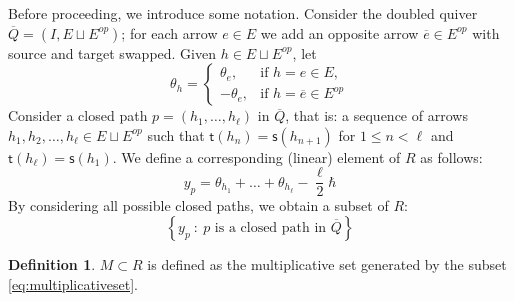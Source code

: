 \documentclass[11pt,reqno]{amsart}
\numberwithin{equation}{section}
\theoremstyle{definition}
\newtheorem{Definition}[equation]{Definition}
\newcommand{\source}{\mathsf{s}}
\newcommand{\target}{\mathsf{t}}
\newcommand{\quiver}{Q}
\newcommand{\arrowset}{E}
\newcommand{\base}{R}
\begin{document}
Before proceeding, we introduce some notation. Consider the doubled quiver $\overline{\quiver} = (I, \arrowset\sqcup \arrowset^{op})$;  for each arrow $e \in \arrowset$ we add an opposite arrow $\overline{e} \in \arrowset^{op}$ with source and target swapped.  Given $h \in \arrowset\sqcup \arrowset^{op}$, let 
\begin{equation}
\theta_h =  \left\{ \begin{array}{cl} \theta_e, & \text{if } h = e \in \arrowset, \\ - \theta_e, & \text{if } h = \overline{e} \in \arrowset^{op} \end{array} \right. 
\end{equation}
Consider a closed path $p = (h_1,\ldots,h_\ell)$ in $\overline{Q}$, that is: a sequence of arrows $h_1,h_2,\ldots,h_\ell \in \arrowset\sqcup \arrowset^{op}$ such that $\target(h_n) = \source(h_{n+1})$ for $1 \leq n < \ell$ and $\target(h_\ell) = \source(h_1)$.  We define a corresponding (linear) element of  $\base$ as follows:
\begin{equation}
    \label{eq:elementsfrompaths}
    y_p = \theta_{h_1} + \ldots + \theta_{h_\ell} - \frac{\ell}{2} \hbar
\end{equation}
By considering all possible closed paths, we obtain a subset of $\base$:
\begin{equation}
    \label{eq:multiplicativeset}
    \left\{ y_p \ : \ p \text{ is a closed path in } \overline{\quiver} \right\}
\end{equation}
\begin{Definition}
    \label{def:multiplicativeset}
    $M \subset \base$ is defined as the multiplicative set generated by the subset \eqref{eq:multiplicativeset}.
\end{Definition}
\end{document}

